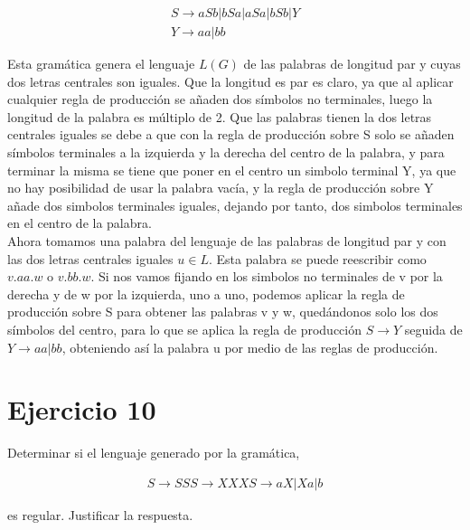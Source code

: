 \documentclass[a4paper,11pt]{article}
\begin{document}
\begin{align*}
S \rightarrow aSb|bSa|aSa|bSb|Y \\
Y \rightarrow aa|bb
\end{align*}

Esta gramática genera el lenguaje $L(G)$ de las palabras de longitud par y cuyas dos letras centrales son iguales. Que la longitud es par es claro, ya que al aplicar cualquier regla de producción se añaden dos símbolos no terminales, luego la longitud de la palabra es múltiplo de 2. Que las palabras tienen la dos letras centrales iguales se debe a que con la regla de producción sobre S solo se añaden símbolos terminales a la izquierda y la derecha del centro de la palabra, y para terminar la misma se tiene que poner en el centro un simbolo terminal Y, ya que no hay posibilidad de usar la palabra vacía, y la regla de producción sobre Y añade dos simbolos terminales iguales, dejando por tanto, dos simbolos terminales en el centro de la palabra. \\

Ahora tomamos una palabra del lenguaje de las palabras de longitud par y con las dos letras centrales iguales $u \in L$. Esta palabra se puede reescribir como $v.aa.w$ o $v.bb.w$. Si nos vamos fijando en los simbolos no terminales de v por la derecha y de w por la izquierda, uno a uno, podemos aplicar la regla de producción sobre S para obtener las palabras v y w, quedándonos solo los dos símbolos del centro, para lo que se aplica la regla de producción $S \rightarrow Y$ seguida de $Y \rightarrow aa|bb$, obteniendo así la palabra u por medio de las reglas de producción.

\section{Ejercicio 10}
Determinar si el lenguaje generado por la gramática,

\begin{align*}
S \rightarrow SS
S \rightarrow XXX
S \rightarrow aX|Xa|b
\end{align*}

es regular. Justificar la respuesta.
\end{document}
